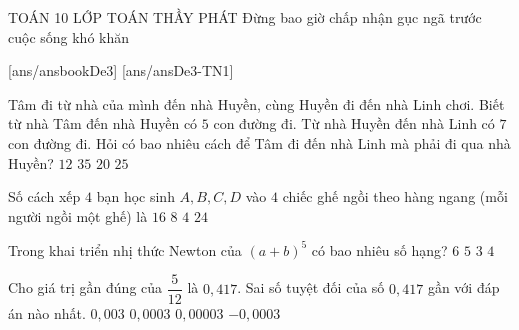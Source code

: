 \begin{name}
	{\tenchude}
	{TOÁN 10}
	{LỚP TOÁN THẦY PHÁT}
	{Đừng bao giờ chấp nhận gục ngã trước cuộc sống khó khăn}
\end{name}
[ans/ansbookDe3]
\TN
{}[ans/ansDe3-TN1]
\begin{ex}%
Tâm đi từ nhà của mình đến nhà Huyền, cùng Huyền đi đến nhà Linh chơi. Biết từ nhà Tâm đến nhà Huyền có $5$ con đường đi. Từ nhà Huyền đến nhà Linh có $7$ con đường đi. Hỏi có bao nhiêu cách để Tâm đi đến nhà Linh mà phải đi qua nhà Huyền?
\choice
{$12$}
{\True $35$}
{$20$}
{$25$}
\end{ex}

\begin{ex}%
Số cách xếp $4$ bạn học sinh $A, B, C, D$ vào $4$ chiếc ghế ngồi theo hàng ngang (mỗi người ngồi một ghế) là
\choice
{$16$}
{$8$}
{$4$}
{\True $24$}
\end{ex}

\begin{ex}%
Trong khai triển nhị thức Newton của $(a+b)^5$ có bao nhiêu số hạng?
\choice
{\True $6$}
{$5$}
{$3$}
{$4$}
\end{ex}

\begin{ex}%
	Cho giá trị gần đúng của $\dfrac{5}{12}$ là $0{,}417$. Sai số tuyệt đối của số $0{,}417$ gần với đáp án nào nhất.
	\choice
	{$0{,}003$}
	{\True $0{,}0003$}
	{$0{,}00003$}
	{$-0{,}0003$}
\end{ex}


